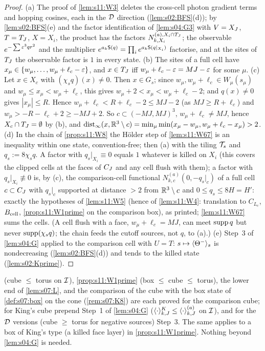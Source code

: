 \begin{proof}
(a) The proof of \cref{lem:s11:W3} deletes the cross-cell photon gradient terms and hopping cosines, each in the $\mathcal D$ direction (\cref{lem:s02:BFS}(d)); by \cref{lem:s02:BFS}(e) and the factor identification of \cref{lem:s04:G3} with $V=X_J$, $T=T_J$, $X=X_i$, the product has the factors $N^{(a),X_i\cap T_J}_{k,X_i}$; the observable $e^{-\sum\varepsilon^3qr^2}$ and the multiplier $e^{a_k\mathsf S(q)}=\prod_ie^{a_k\mathsf S(q|_{X_i})}$ factorise, and at the sites of $T_J$ the observable factor is $1$ in every state. (b) The sites of a full cell have $x_\mu\in\{w_\mu,\dots,w_\mu+\ell_c-\varepsilon\}$, and $x\in T_J$ iff $w_\mu+\ell_c-\varepsilon=MJ-\varepsilon$ for some $\mu$. (c) Let $x\in X_c$ with $(\chi_sq)(x)\ne0$. Then $x\in G_s$; since $w_\mu,w_\mu+\ell_c\in W_\mu(s_\mu)$ and $w_\mu\le x_\mu<w_\mu+\ell_c$, this gives $w_\mu+2<x_\mu<w_\mu+\ell_c-2$; and $q(x)\ne0$ gives $|x_\mu|\le R$. Hence $w_\mu+\ell_c<R+\ell_c-2\le MJ-2$ (as $MJ\ge R+\ell_c$) and $w_\mu>-R-\ell_c+2\ge-MJ+2$. So $c\subset(-MJ,MJ)^3$, $w_\mu+\ell_c\ne MJ$, hence $X_c\cap T_J=\emptyset$ by (b), and $\operatorname{dist}_\infty(x,\mathbb R^3\setminus c)=\min_\mu\min(x_\mu-w_\mu,w_\mu+\ell_c-x_\mu)>2$. (d) In the chain of \cref{prop:s11:W8} the Hölder step of \cref{lem:s11:W67} is an inequality within one state, convention-free; then (a) with the tiling $\mathcal T_s$ and $q_s:=8\chi_sq$. A factor with $q_s|_{X_i}\equiv0$ equals $1$ whatever is killed on $X_i$ (this covers the clipped cells at the faces of $C_J$ and any cell flush with them); a factor with $q_s|_{X_i}\not\equiv0$ is, by (c), the comparison-cell functional $N^{(a)}_{k,c}(0,-q_s|_c)$ of a full cell $c\subset C_J$ with $q_s|_c$ supported at distance $>2$ from $\mathbb R^3\setminus c$ and $0\le q_s\le8H=H'$: exactly the hypotheses of \cref{lem:s11:W5} (hence of \cref{lem:s11:W4}: translation to $C_{L_c}$, $B_{\rm cell}$, \cref{prop:s11:W1prime} on the comparison box), as printed; \cref{lem:s11:W67} sums the cells. (A cell flush with a face, $w_\mu+\ell_c=MJ$, can meet $\operatorname{supp} q$ but never $\operatorname{supp}(\chi_sq)$; the chain feeds the cutoff sources, not $q$, to (a).) (e) Step~3 of \cref{lem:s04:G} applied to the comparison cell with $U=T$: $s\mapsto\langle \Theta^-\rangle_s$ is nondecreasing (\cref{lem:s02:BFS}(d)) and tends to the killed state (\cref{lem:s02:Kprime}).
\end{proof}

\begin{remark}\label{rem:s04:F}
 (cube $\le$ torus on $\mathcal I$), \cref{prop:s11:W1prime} (box $\le$ cube $\le$ torus), the lower end of \cref{lem:s07:L}, and the comparison of the cube with the box state of \cref{def:s07:box} on the cone (\cref{rem:s07:K8}) are each proved for the comparison cube; for King's cube prepend Step~1 of \cref{lem:s04:G} ($\langle \cdot\rangle^{K}_{k,J}\le\langle \cdot\rangle^{(a)}_{k,J}$ on $\mathcal I$), and for the $\mathcal D$ versions (cube $\ge$ torus for negative sources) Step~3. The same applies to a box of King's type (a killed face layer) in \cref{prop:s11:W1prime}. Nothing beyond \cref{lem:s04:G} is needed.
\end{remark}

